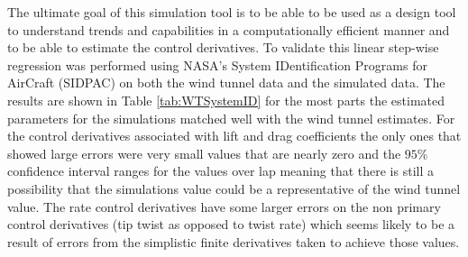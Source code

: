 \documentclass[11pt]{ucthesis}
\begin{document}
The ultimate goal of this simulation tool is to be able to be used as a design tool to understand trends and capabilities in a computationally efficient manner and to be able to estimate the control derivatives. To validate this linear step-wise regression was performed using NASA's System IDentification Programs for AirCraft (SIDPAC) \cite{klein2006aircraft} on both the wind tunnel data and the simulated data. The results are shown in Table \ref{tab:WTSystemID} for the most parts the estimated parameters for the simulations matched well with the wind tunnel estimates. For the control derivatives associated with lift and drag coefficients the only ones that showed large errors were very small values that are nearly zero and the $95\%$ confidence interval ranges for the values over lap meaning that there is still a possibility that the simulations value could be a representative of the wind tunnel value. The rate control derivatives have some larger errors on the non primary control derivatives (tip twist as opposed to twist rate) which seems likely to be a result of errors from the simplistic finite derivatives  taken to achieve those values.%

\end{document}
